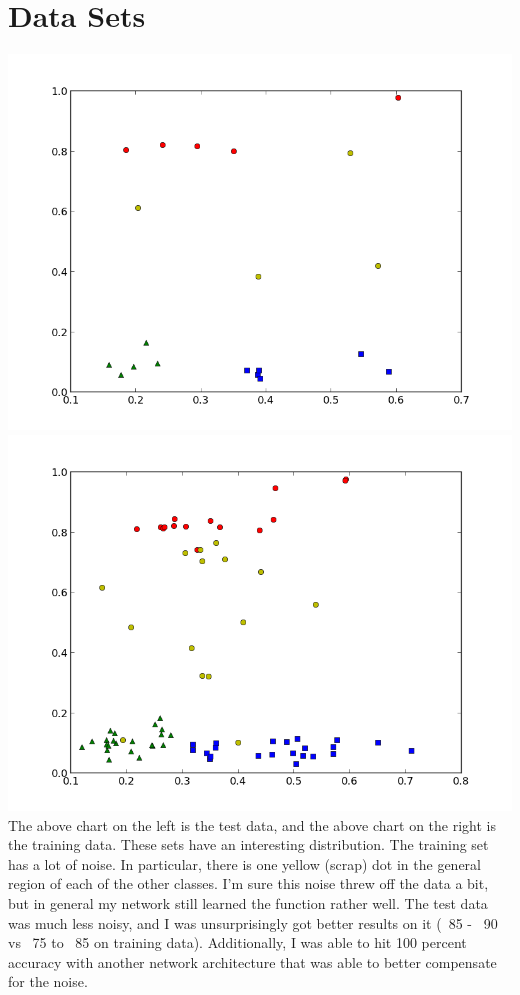 \documentclass{book}
\begin{document}
\section*{Data Sets}
\includegraphics[scale=0.45]{function.png}
\includegraphics[scale=0.45]{training.png}
The above chart on the left is the test data, and the above chart on the right is the training data.  These sets have an interesting distribution.  The training set has a lot of noise.  In particular, there is one yellow (scrap) dot in the general region of each of the other classes.  I'm sure this noise threw off the data a bit, but in general my network still learned the function rather well.  The test data was much less noisy, and I was unsurprisingly got better results on it (~85 - ~90 vs ~75 to ~85 on training data).  Additionally, I was able to hit 100 percent accuracy with another network architecture that was able to better compensate for the noise.  
\end{document}
